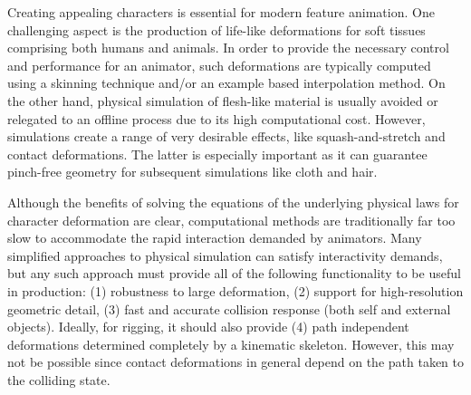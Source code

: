 Creating appealing characters is essential for modern feature animation. One challenging aspect is the production of life-like deformations for soft tissues comprising both humans and animals. In order to provide the necessary control and performance for an animator, such deformations are typically computed using a skinning technique and/or an example based interpolation method. On the other hand, physical simulation of flesh-like material is usually avoided or relegated to an offline process due to its high computational cost. However, simulations create a range of very desirable effects, like squash-and-stretch and contact deformations. The latter is especially important as it can guarantee pinch-free geometry for subsequent simulations like cloth and hair. 


Although the benefits of solving the equations of the underlying physical laws for character deformation are clear, computational methods are traditionally far too slow to accommodate the rapid interaction demanded by animators. Many simplified approaches to physical simulation can satisfy interactivity demands, but any such approach must provide all of the following functionality to be useful in production: (1) robustness to large deformation, (2) support for high-resolution geometric detail, (3) fast and accurate collision response (both self and external objects). Ideally, for rigging, it should also provide (4) path independent deformations determined completely by a kinematic skeleton. However, this may not be possible since contact deformations in general depend on the path taken to the colliding state.


